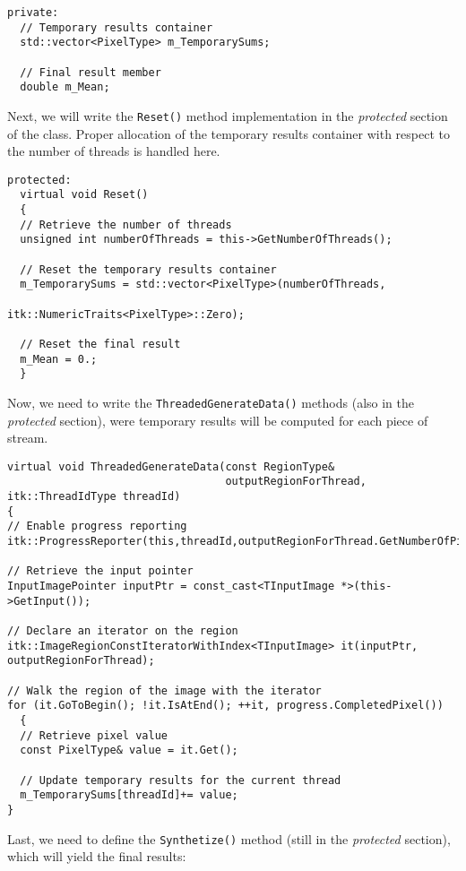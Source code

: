 \begin{lstlisting}
private:
  // Temporary results container
  std::vector<PixelType> m_TemporarySums;

  // Final result member
  double m_Mean;
\end{lstlisting}

Next, we will write the \verb?Reset()? method implementation in the
\emph{protected} section of the class. Proper allocation of the
temporary results container with respect to the number of threads is
handled here.


\begin{lstlisting}
protected:
  virtual void Reset()
  {
  // Retrieve the number of threads
  unsigned int numberOfThreads = this->GetNumberOfThreads();

  // Reset the temporary results container
  m_TemporarySums = std::vector<PixelType>(numberOfThreads,
                                           itk::NumericTraits<PixelType>::Zero);

  // Reset the final result
  m_Mean = 0.;
  }
\end{lstlisting}

Now, we need to write the \verb?ThreadedGenerateData()? methods (also
in the \emph{protected} section), were
temporary results will be computed for each piece of stream.

\begin{lstlisting}
virtual void ThreadedGenerateData(const RegionType&
                                  outputRegionForThread, itk::ThreadIdType threadId)
{
// Enable progress reporting
itk::ProgressReporter(this,threadId,outputRegionForThread.GetNumberOfPixels());

// Retrieve the input pointer
InputImagePointer inputPtr = const_cast<TInputImage *>(this->GetInput());

// Declare an iterator on the region
itk::ImageRegionConstIteratorWithIndex<TInputImage> it(inputPtr,
outputRegionForThread);

// Walk the region of the image with the iterator
for (it.GoToBegin(); !it.IsAtEnd(); ++it, progress.CompletedPixel())
  {
  // Retrieve pixel value
  const PixelType& value = it.Get();

  // Update temporary results for the current thread
  m_TemporarySums[threadId]+= value;
}

\end{lstlisting}

Last, we need to define the \verb?Synthetize()? method (still in the
\emph{protected} section), which will yield the final results:

